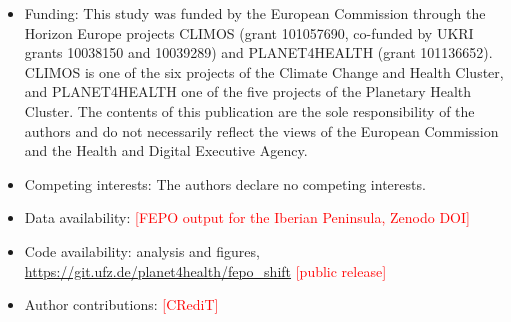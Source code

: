 \documentclass[pdflatex,sn-basic]{sn-jnl}
\newcommand{\todo}[1]{\textcolor{red}{[#1]}}
\begin{document}
\begin{itemize}
\item Funding: This study was funded by the European Commission through the Horizon Europe projects CLIMOS (grant 101057690, co-funded by UKRI grants 10038150 and 10039289) and PLANET4HEALTH (grant 101136652). CLIMOS is one of the six projects of the Climate Change and Health Cluster, and PLANET4HEALTH one of the five projects of the Planetary Health Cluster. The contents of this publication are the sole responsibility of the authors and do not necessarily reflect the views of the European Commission and the Health and Digital Executive Agency.
\item Competing interests: The authors declare no competing interests.
\item Data availability: \todo{FEPO output for the Iberian Peninsula, Zenodo DOI}
\item Code availability: analysis and figures, \url{https://git.ufz.de/planet4health/fepo_shift} \todo{public release}
\item Author contributions: \todo{CRediT}
\end{itemize}


\end{document}
